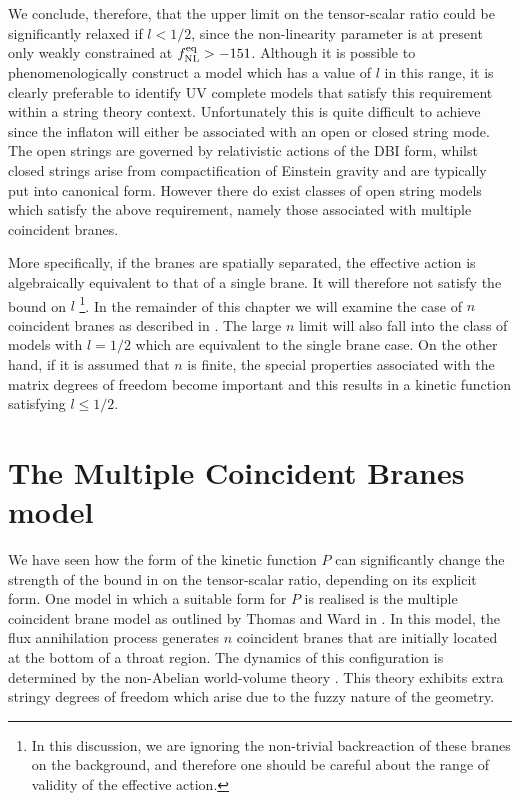 We conclude, therefore, that 
the upper limit on the tensor-scalar ratio could be significantly 
relaxed if $l <1/2$, since the non-linearity parameter is at present only 
weakly constrained at $f_{\mathrm{NL}}^{\mathrm{eq}} >-151$. Although it is possible 
to phenomenologically construct a model which has a value of $l$ in this 
range, it is clearly preferable to identify  UV complete models
that satisfy this requirement within a string theory context. 
Unfortunately this is quite difficult to achieve since the inflaton 
will either be associated with an open or closed string mode. 
The open strings are governed by relativistic actions of the 
DBI form, whilst closed strings arise from compactification of Einstein gravity
and are typically put into canonical form.
However there do exist classes of open string
models which satisfy the above requirement, 
namely those associated with multiple coincident branes.


More specifically, if the branes are
spatially separated, the effective action is algebraically equivalent 
to that of a single brane. It will therefore not satisfy the 
bound on $l$ \footnote{In this discussion, we are ignoring 
the non-trivial backreaction of these branes on the background, and therefore 
one should be careful about the range of validity of the effective action.}. 
In the remainder of this chapter we will examine the case of $n$ coincident
branes as described in . The large $n$ limit will also
fall into the class of models with $l=1/2$ which are equivalent to the single
brane case. On the other hand, if it is assumed that 
$n$ is finite, the special properties associated with the 
matrix degrees of freedom become important and this 
results in a kinetic function satisfying $l \le 1/2$.



% 
% 
% 
\section{The Multiple Coincident Branes model} 
\label{sec:multibranes-multi}


We have seen how the form of the kinetic function
$P$ can significantly change the
strength of the bound in  on the tensor-scalar ratio, depending
on its explicit
form. One model in which a suitable form for 
$P$ is realised is the multiple coincident
brane model as outlined by Thomas and Ward in .
In this model, the flux annihilation process 
generates $n$ coincident branes that are initially located at the 
bottom of a throat region. The dynamics of this configuration
is determined by the non-Abelian world-volume theory \cite{myers1,myers2}. 
This theory exhibits extra stringy degrees of freedom which arise due to the 
fuzzy nature of the geometry.

